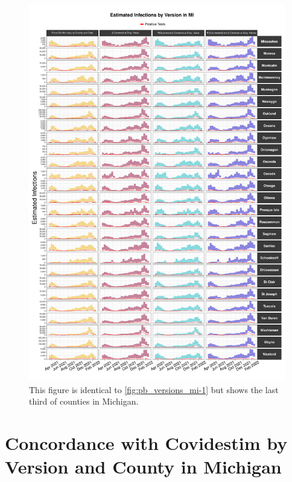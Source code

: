 \documentclass[12pt,twoside]{smiththesis}
\begin{document}
\begin{figure}

{\centering \includegraphics[width=1\linewidth]{figure/mi3_pb_compared_to_observed} 

}

\caption{\label{fig:pb_versions_mi-3} This figure is identical to \ref{fig:pb_versions_mi-1} but shows the last third of counties in Michigan.}\label{fig:unnamed-chunk-120}
\end{figure}
\hypertarget{concordance-with-covidestim-by-version-and-county-in-michigan}{%
\section{Concordance with Covidestim by Version and County in Michigan}\label{concordance-with-covidestim-by-version-and-county-in-michigan}}
\end{document}
